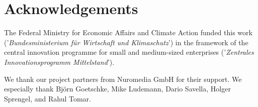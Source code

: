 \documentclass[runningheads]{llncs}
\begin{document}
\section*{Acknowledgements}

The Federal Ministry for Economic Affairs and Climate Action funded this work
('\textsl{Bundesministerium f\"ur Wirtschaft und Klimaschutz}')
in the framework of the central innovation programme
for small and medium-sized enterprises
('\textsl{Zentrales Innovationsprogramm Mittelstand}').

We thank our project partners from Nuromedia GmbH for their support.
We especially thank Björn Goetschke, Mike Ludemann, Dario Savella, Holger Sprengel, and Rahul Tomar.



\end{document}
